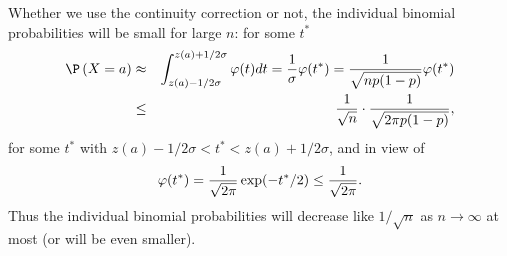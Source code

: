 Whether we use the continuity correction or not, the individual binomial
probabilities will be small for large $n$: for some $t^{\ast }$ 
\begin{eqnarray*}
\P \left( X=a\right) &\approx &\int_{z(a)-1/2\sigma }^{z(a)+1/2\sigma
}\varphi (t)dt=\frac{1}{\sigma }\varphi (t^{\ast })=\frac{1}{\sqrt{np(1-p)}}%
\varphi (t^{\ast }) \\
&\leq &\frac{1}{\sqrt{n}}\cdot \frac{1}{\sqrt{2\pi p(1-p)}},
\end{eqnarray*}
for some $t^{\ast }$ with $z(a)-1/2\sigma <t^{\ast }<z(a)+1/2\sigma $, and
in view of 
\begin{equation*}
\varphi (t^{\ast })=\frac{1}{\sqrt{2\pi }}\exp (-t^{\ast }/2)\leq \frac{1}{%
\sqrt{2\pi }}.
\end{equation*}%
Thus the individual binomial probabilities will decrease like $1/\sqrt{n}$
as $n\rightarrow \infty $ at most (or will be even smaller).

